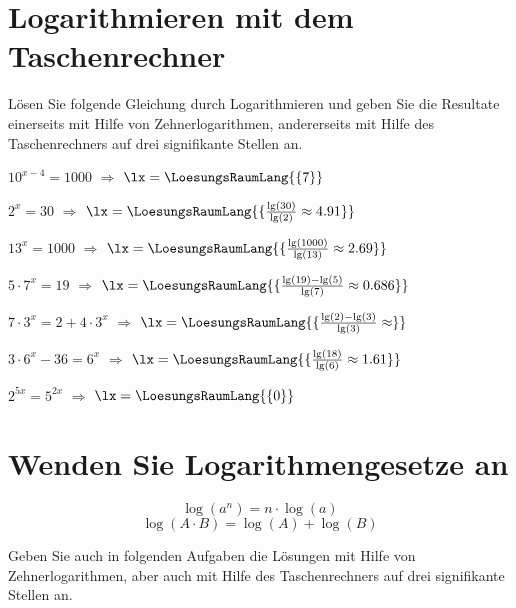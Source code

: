 \platzFuerBerechnungenBisEndeSeite{}

\section{Logarithmieren mit dem Taschenrechner}
Lösen Sie folgende Gleichung durch Logarithmieren und geben Sie die
Resultate einerseits mit Hilfe von Zehnerlogarithmen, andererseits mit
Hilfe des Taschenrechners auf drei signifikante Stellen an.

\begin{bbwAufgabenBlock}
\item $10^{x-4}=1000$ $\Longrightarrow$ $\lx=\LoesungsRaumLang{\{7\}}$ \plz{}
\item $2^x=30$ $\Longrightarrow$ $\lx=\LoesungsRaumLang{\{\frac{\lg(30)}{\lg(2)}\approx 4.91}\}$ \plz{}
\item $13^x=1000$ $\Longrightarrow$ $\lx=\LoesungsRaumLang{\{\frac{\lg(1000)}{\lg(13)}\approx 2.69\}}$ \plz{}\noTRAINER{\newpage}
\item $5\cdot{}7^x = 19$ $\Longrightarrow$ $\lx=\LoesungsRaumLang{\{\frac{\lg(19)-\lg(5)}{\lg(7)}\approx 0.686\}}$ \plz{}
\item $7\cdot{}3^x = 2 + 4\cdot{}3^x$ $\Longrightarrow$ $\lx=\LoesungsRaumLang{\{\frac{\lg(2)-\lg(3)}{\lg(3)}\approx  \}}$ \plz{}
\item $3\cdot{}6^x - 36 = 6^x$ $\Longrightarrow$ $\lx=\LoesungsRaumLang{\{\frac{\lg(18)}{\lg(6)} \approx  1.61 \}}$ \plz{}\noTRAINER{\newpage}
\item $2^{5x} = 5^{2x}$ $\Longrightarrow$ $\lx=\LoesungsRaumLang{\{0\}}$ \plz{}
\end{bbwAufgabenBlock}

\platzFuerBerechnungenBisEndeSeite{}

\section{Wenden Sie Logarithmengesetze an}

$$\log(a^n) = n\cdot{}\log(a)$$
$$\log(A\cdot{}B) = \log(A) + \log(B)$$

Geben Sie auch in folgenden Aufgaben die Lösungen mit Hilfe von
Zehnerlogarithmen, aber auch mit Hilfe des Taschenrechners auf drei
signifikante Stellen an.


